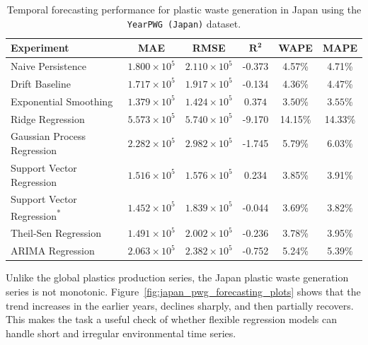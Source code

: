\begin{table}[!ht]
	\centering
	\caption{\centering Temporal forecasting performance for plastic waste generation in Japan using the \texttt{YearPWG (Japan)} dataset.}
	\begin{tabular}{@{}lccccc@{}}
		\toprule
		\textbf{Experiment}                          & \textbf{MAE}          & \textbf{RMSE}         & $\mathbf{R^2}$     & \textbf{WAPE}       & \textbf{MAPE}       \\
		\midrule
		Naive Persistence                            & \(1.800 \times 10^5\) & \(2.110 \times 10^5\) & -0.373             & 4.57\%              & 4.71\%              \\
		Drift Baseline                               & \(1.717 \times 10^5\) & \(1.917 \times 10^5\) & -0.134             & 4.36\%              & 4.47\%              \\
		Exponential Smoothing                        & \(1.379 \times 10^5\) & \(1.424 \times 10^5\) & \(\mathbf{0.374}\) & \(\mathbf{3.50}\)\% & \(\mathbf{3.55}\)\% \\
		Ridge Regression                             & \(5.573 \times 10^5\) & \(5.740 \times 10^5\) & -9.170             & 14.15\%             & 14.33\%             \\
		Gaussian Process Regression                  & \(2.282 \times 10^5\) & \(2.982 \times 10^5\) & -1.745             & 5.79\%              & 6.03\%              \\
		Support Vector Regression                    & \(1.516 \times 10^5\) & \(1.576 \times 10^5\) & 0.234              & 3.85\%              & 3.91\%              \\
		Support Vector Regression\textsuperscript{*} & \(1.452 \times 10^5\) & \(1.839 \times 10^5\) & -0.044             & 3.69\%              & 3.82\%              \\
		Theil-Sen Regression                         & \(1.491 \times 10^5\) & \(2.002 \times 10^5\) & -0.236             & 3.78\%              & 3.95\%              \\
		ARIMA Regression                             & \(2.063 \times 10^5\) & \(2.382 \times 10^5\) & -0.752             & 5.24\%              & 5.39\%              \\
		\hline
	\end{tabular}
	\label{tab:japan_pwg_forecasting_metric_table}
\end{table}

Unlike the global plastics production series, the Japan plastic waste generation series is not monotonic. Figure~\ref{fig:japan_pwg_forecasting_plots} shows that the trend increases in the earlier years, declines sharply, and then partially recovers. This makes the task a useful check of whether flexible regression models can handle short and irregular environmental time series.


